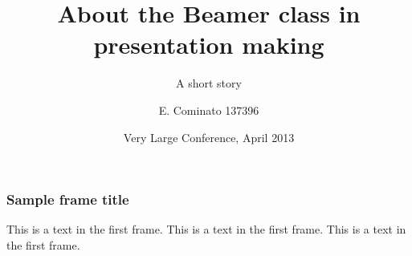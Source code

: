 \documentclass{beamer}
\title[About Beamer] %
{About the Beamer class in presentation making}
\subtitle{A short story}
\author[Enrico] %
{E. Cominato 137396\inst{1}}
\institute %
{
  \inst{1}%
  Dipartimento di Scienze Matematiche, Informatiche e Fisiche\\
  Università degli studi di Udine
}
\date[VLC 2013] %
{Very Large Conference, April 2013}
\begin{document}
\frame{\titlepage}

\begin{frame}
\frametitle{Sample frame title}
This is a text in the first frame. This is a text in the first frame. This is a text in the first frame.
\end{frame}
\end{document}

